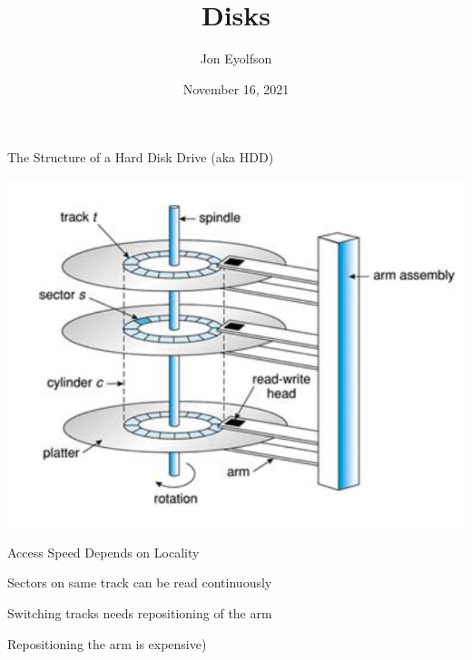 

\title{Disks}
\author{Jon Eyolfson}
\date{November 16, 2021}


  \begin{frame}
    \titlepage
  \end{frame}

  \begin{frame}{The Structure of a Hard Disk Drive (aka HDD)}
    \begin{center}
        \includegraphics[height=0.8\textheight]{hdd1.png}
    \end{center}
  \end{frame}

  \begin{frame}{Access Speed Depends on Locality}

    Sectors on same track can be read continuously

    \vspace{2em}

    Switching tracks needs repositioning of the arm

    \hspace{2em} Repositioning the arm is expensive)
  \end{frame}


